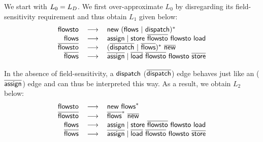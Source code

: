 


We start with $L_0=\mbox{${L}_D$}$. We first over-approximate $L_0$ by disregarding its field-sensitivity requirement 
and thus obtain 
$L_1$ given  below:
\begin{equation}
\label{eqn:newL1}
\begin{tabular}{rcl}
$\flowsto$ & $\longrightarrow$ & $\new~(\flows~|~\indispatch)^*$ \\
$\flows$ & $\longrightarrow$ & $\assign \mid \store \ \iflowsto ~ \flowsto \ \load$ \\
$\iflowsto$ & $\longrightarrow$ & $(\iindispatch~|~\iflows)^*~\inew$ \\
$\iflows$ & $\longrightarrow$ & $\iassign \mid \iload \ \iflowsto ~ \flowsto \ \istore$  \\
\end{tabular}
\end{equation}

In the absence of field-sensitivity,  a $\textsf{dispatch}$ ($\overline{\textsf{dispatch}}$) edge behaves just
like an  \assign ($\overline{\textsf{assign}}$) edge and can thus be interpreted this way. As a result, we 
obtain $L_2$ below:
\begin{equation}
\label{eqn:newL2}
\begin{tabular}{rcl} 
$\flowsto$ &  $\longrightarrow$ & $\new ~ \flows^*$ \\
$\iflowsto$ & $\longrightarrow$ & $\iflows^* ~ \inew$ \\
$\flows$  & $\longrightarrow$ & $\assign \mid  \store \ \iflowsto\ \flowsto \ \load$ \\
$\iflows$ & $\longrightarrow$ & $\iassign \mid \iload \ \iflowsto\ \flowsto \ \istore$\\
\end{tabular}
\end{equation}

